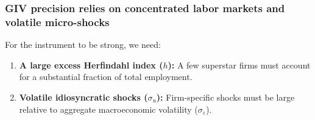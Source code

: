 \documentclass[aspectratio=169,11pt]{beamer}
\begin{document}
\begin{frame}
    \frametitle{GIV precision relies on concentrated labor markets and volatile micro-shocks}

    \vspace{0.5cm}
    {\Large
        For the instrument to be strong, we need:
    }

    \vspace{1cm}
    \begin{enumerate}
        \item \textbf{A large excess Herfindahl index ($h$):} A few superstar firms must account for a substantial fraction of total employment.
              \vspace{0.5cm}
        \item \textbf{Volatile idiosyncratic shocks ($\sigma_u$):} Firm-specific shocks must be large relative to aggregate macroeconomic volatility ($\sigma_\varepsilon$).
    \end{enumerate}

\end{frame}
\end{document}
